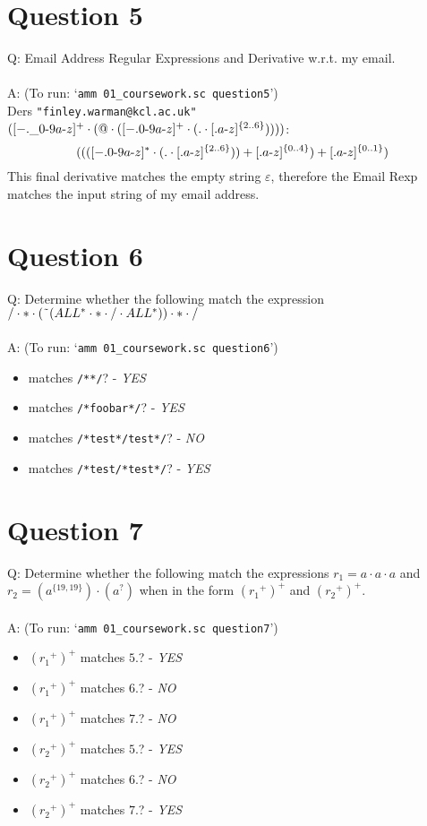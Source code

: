 \documentclass[english]{scrartcl}
\begin{document}
\section*{Question 5}
Q: Email Address Regular Expressions and Derivative w.r.t. my email.
\\
\\
A: (To run: `\verb|amm 01_coursework.sc question5|') \\
Ders \verb~"finley.warman@kcl.ac.uk" ~$([-.\_0{\text -}9a{\text -}z]^+\cdot(@\cdot([-.0{\text -}9a{\text -}z]^+\cdot(.\cdot[.a{\text -}z]^{\{2..6\}}))))$:
\[
    ((([-.0{\text -}9a{\text -}z]^* \cdot (. \cdot [.a{\text -}z]^{\{2..6\}})) + [.a{\text -}z]^{\{0..4\}}) + [.a{\text -}z]^{\{0..1\}})
\]
This final derivative matches the empty string $\varepsilon$, therefore the Email Rexp matches the input string of my email address.

\section*{Question 6}
Q: Determine whether the following match the expression
$ / \cdot * \cdot (\char`\~(ALL^* \cdot * \cdot / \cdot ALL^*)) \cdot * \cdot /$
\\
\\
A: (To run: `\verb|amm 01_coursework.sc question6|') \\
\begin{itemize}
    \item matches \verb|/**/|? - \textit{YES}
    \item matches \verb|/*foobar*/|? - \textit{YES}
    \item matches \verb|/*test*/test*/|? - \textit{NO}
    \item matches \verb|/*test/*test*/|? - \textit{YES}

\end{itemize}

\section*{Question 7}
Q: Determine whether the following match the expressions $ r_1 = a \cdot a \cdot a$ and
$ r_2 = (a^{\{19,19\}}) \cdot (a^?)$ when in the form $({r_1}^+)^+$ and $({r_2}^+)^+$.
\\
\\
A: (To run: `\verb|amm 01_coursework.sc question7|')
\begin{itemize}
    \item $({r_1}^+)^+$ matches $5.$? - \textit{YES}
    \item $({r_1}^+)^+$ matches $6.$? - \textit{NO}
    \item $({r_1}^+)^+$ matches $7.$? - \textit{NO}
    \item $({r_2}^+)^+$ matches $5.$? - \textit{YES}
    \item $({r_2}^+)^+$ matches $6.$? - \textit{NO}
    \item $({r_2}^+)^+$ matches $7.$? - \textit{YES}
\end{itemize}
\end{document}
